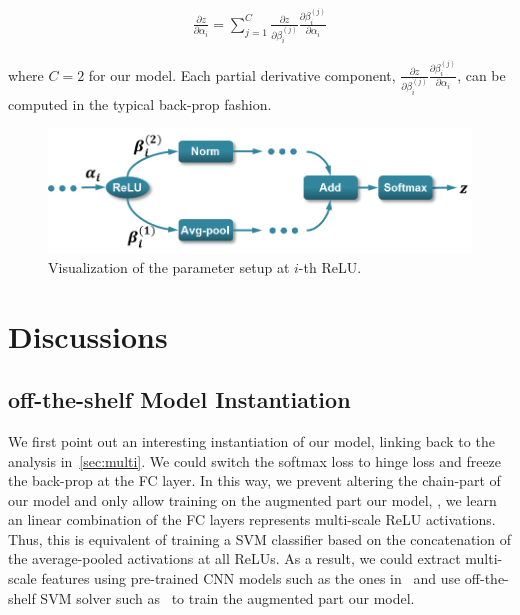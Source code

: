 \documentclass[10pt,twocolumn,letterpaper]{article}
\begin{document}
\begin{align}
\frac{\partial z}{\partial \alpha_i}=\sum_{j=1}^{C}\frac{\partial z}{\partial \beta_i^{(j)}}\frac{\partial \beta_i^{(j)}}{\partial \alpha_i}
\end{align}

\noindent where $C=2$ for our model. Each partial derivative component, $\frac{\partial z}{\partial \beta_i^{(j)}}\frac{\partial \beta_i^{(j)}}{\partial \alpha_i}$, can be computed in the typical back-prop fashion. 


\begin{figure}[htbp]
\centering
	\includegraphics[width=\columnwidth]{fig/fig_backprop_eq.png}
\caption{Visualization of the parameter setup at $i$-th ReLU.}

\label{fig:backprop_eq}
\end{figure}


\section{Discussions\label{sec:ana}}

\subsection{off-the-shelf Model Instantiation}

We first point out an interesting instantiation of our model, linking back to the analysis in~\ref{sec:multi}. We could switch the softmax loss to hinge loss and freeze the back-prop at the FC layer. In this way, we prevent altering the chain-part of our model and only allow training on the augmented part our model, \ie, we learn an linear combination of the FC layers represents multi-scale ReLU activations. Thus, this is equivalent of training a SVM classifier based on the concatenation of the average-pooled activations at all ReLUs. As a result, we could extract multi-scale features using pre-trained CNN models such as the ones in~\cite{AlexNet, veryDeep} and use off-the-shelf SVM solver such as~\cite{liblinear} to train the augmented part our model.
\end{document}
